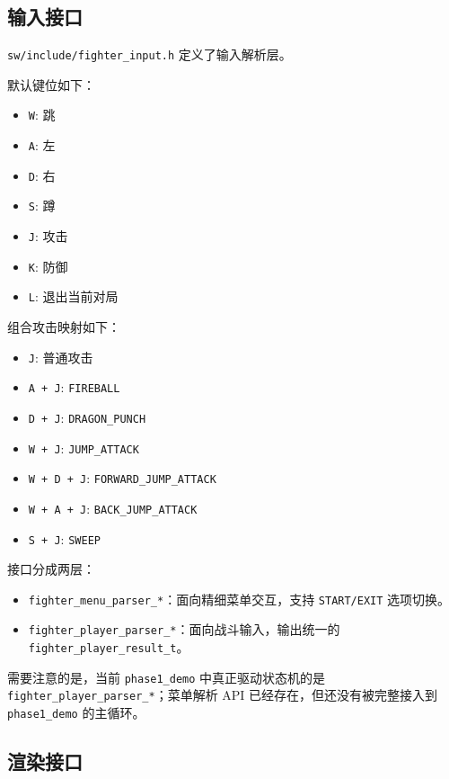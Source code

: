 \documentclass[12pt,a4paper]{ctexart}
\begin{document}
\subsection{输入接口}

\texttt{sw/include/fighter\_input.h} 定义了输入解析层。

默认键位如下：

\begin{itemize}
  \item \texttt{W}: 跳
  \item \texttt{A}: 左
  \item \texttt{D}: 右
  \item \texttt{S}: 蹲
  \item \texttt{J}: 攻击
  \item \texttt{K}: 防御
  \item \texttt{L}: 退出当前对局
\end{itemize}

组合攻击映射如下：

\begin{itemize}
  \item \texttt{J}: 普通攻击
  \item \texttt{A + J}: \texttt{FIREBALL}
  \item \texttt{D + J}: \texttt{DRAGON\_PUNCH}
  \item \texttt{W + J}: \texttt{JUMP\_ATTACK}
  \item \texttt{W + D + J}: \texttt{FORWARD\_JUMP\_ATTACK}
  \item \texttt{W + A + J}: \texttt{BACK\_JUMP\_ATTACK}
  \item \texttt{S + J}: \texttt{SWEEP}
\end{itemize}

接口分成两层：

\begin{itemize}
  \item \texttt{fighter\_menu\_parser\_*}：面向精细菜单交互，支持 \texttt{START/EXIT} 选项切换。
  \item \texttt{fighter\_player\_parser\_*}：面向战斗输入，输出统一的 \texttt{fighter\_player\_result\_t}。
\end{itemize}

需要注意的是，当前 \texttt{phase1\_demo} 中真正驱动状态机的是 \texttt{fighter\_player\_parser\_*}；菜单解析 API 已经存在，但还没有被完整接入到 \texttt{phase1\_demo} 的主循环。

\subsection{渲染接口}
\end{document}
